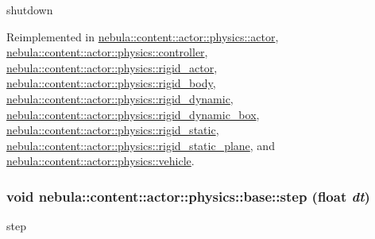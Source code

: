 shutdown 

Reimplemented in \hyperlink{classnebula_1_1content_1_1actor_1_1physics_1_1actor_ae995fe68be64a916df1bb7174cb8c7a3}{nebula::content::actor::physics::actor}, \hyperlink{classnebula_1_1content_1_1actor_1_1physics_1_1controller_a826208e0d0b4cdcf52882b4eab3bd361}{nebula::content::actor::physics::controller}, \hyperlink{classnebula_1_1content_1_1actor_1_1physics_1_1rigid__actor_a19cfcb68b5be57574d96ffe856131aed}{nebula::content::actor::physics::rigid\_\-actor}, \hyperlink{classnebula_1_1content_1_1actor_1_1physics_1_1rigid__body_a99b70594f437d666ec7ee33e4d36c964}{nebula::content::actor::physics::rigid\_\-body}, \hyperlink{classnebula_1_1content_1_1actor_1_1physics_1_1rigid__dynamic_a712d45c781944f79af0d074062674e20}{nebula::content::actor::physics::rigid\_\-dynamic}, \hyperlink{classnebula_1_1content_1_1actor_1_1physics_1_1rigid__dynamic__box_a3f9abbce238ad6bee7363ab9a849512c}{nebula::content::actor::physics::rigid\_\-dynamic\_\-box}, \hyperlink{classnebula_1_1content_1_1actor_1_1physics_1_1rigid__static_acbf24424c29fa78f568f67fe80cee108}{nebula::content::actor::physics::rigid\_\-static}, \hyperlink{classnebula_1_1content_1_1actor_1_1physics_1_1rigid__static__plane_a2ccd43a02a417f4690bc9174e4bf533a}{nebula::content::actor::physics::rigid\_\-static\_\-plane}, and \hyperlink{classnebula_1_1content_1_1actor_1_1physics_1_1vehicle_a7754bdbff0f9be9487ca32a21d6e8d23}{nebula::content::actor::physics::vehicle}.\hypertarget{classnebula_1_1content_1_1actor_1_1physics_1_1base_aac025359e301532039709ea8697bb29f}{
\subsubsection[{step}]{\setlength{\rightskip}{0pt plus 5cm}void nebula::content::actor::physics::base::step (float {\em dt})}}
\label{classnebula_1_1content_1_1actor_1_1physics_1_1base_aac025359e301532039709ea8697bb29f}


step 

